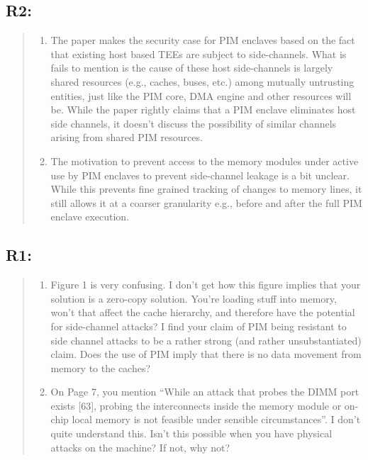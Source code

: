 \documentclass[11pt]{article}
\begin{document}
\subsection{R2:}
\label{sec:org44d9f2a}
\begin{quote}
\begin{enumerate}
\item The paper makes the security case for PIM enclaves based on the fact that existing host based TEEs are subject to side-channels. What is fails to mention is the cause of these host side-channels is largely shared resources (e.g., caches, buses, etc.) among mutually untrusting entities, just like the PIM core, DMA engine and other resources will be. While the paper rightly claims that a PIM enclave eliminates host side channels, it doesn't discuss the possibility of similar channels arising from shared PIM resources.
\item The motivation to prevent access to the memory modules under active use by PIM enclaves to prevent side-channel leakage is a bit unclear. While this prevents fine grained tracking of changes to memory lines, it still allows it at a coarser granularity e.g., before and after the full PIM enclave execution.
\end{enumerate}
\end{quote}
\subsection{R1:}
\label{sec:org4c55a56}
\begin{quote}
\begin{enumerate}
\item Figure 1 is very confusing. I don't get how this figure implies that your solution is a zero-copy solution. You're loading stuff into memory, won't that affect the cache hierarchy, and therefore have the potential for side-channel attacks? I find your claim of PIM being resistant to side channel attacks to be a rather strong (and rather unsubstantiated) claim. Does the use of PIM imply that there is no data movement from memory to the caches?

\item On Page 7, you mention ``While an attack that probes the DIMM port exists [63], probing the interconnects inside the memory module or on-chip local memory is not feasible under sensible circumstances''. I don't quite understand this. Isn't this possible when you have physical attacks on the machine? If not, why not?
\end{enumerate}
\end{quote}
\end{document}
